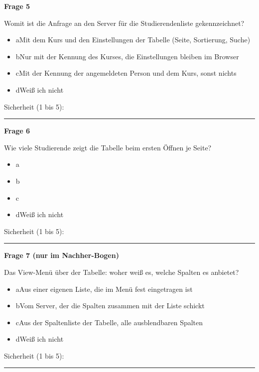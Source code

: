 \medskip

\noindent\begin{minipage}{\linewidth}
\textbf{Frage 5}\par
Womit ist die Anfrage an den Server für die Studierendenliste gekennzeichnet?

\begin{itemize}[nosep,leftmargin=2.4em]
\item[\kreuz] a\quad Mit dem Kurs und den Einstellungen der Tabelle (Seite, Sortierung, Suche)
\item[\kreuz] b\quad Nur mit der Kennung des Kurses, die Einstellungen bleiben im Browser
\item[\kreuz] c\quad Mit der Kennung der angemeldeten Person und dem Kurs, sonst nichts
\item[\kreuz] d\quad Weiß ich nicht
\end{itemize}
\noindent Sicherheit (1 bis 5):~\rule{2.5em}{0.4pt}\par
\end{minipage}

\medskip

\noindent\begin{minipage}{\linewidth}
\textbf{Frage 6}\par
Wie viele Studierende zeigt die Tabelle beim ersten Öffnen je Seite?

\begin{itemize}[nosep,leftmargin=2.4em]
\item[\kreuz] a
\item[\kreuz] b
\item[\kreuz] c
\item[\kreuz] d\quad Weiß ich nicht
\end{itemize}
\noindent Sicherheit (1 bis 5):~\rule{2.5em}{0.4pt}\par
\end{minipage}

\medskip

\noindent\begin{minipage}{\linewidth}
\textbf{Frage 7 (nur im Nachher-Bogen)}\par
Das View-Menü über der Tabelle: woher weiß es, welche Spalten es anbietet?

\begin{itemize}[nosep,leftmargin=2.4em]
\item[\kreuz] a\quad Aus einer eigenen Liste, die im Menü fest eingetragen ist
\item[\kreuz] b\quad Vom Server, der die Spalten zusammen mit der Liste schickt
\item[\kreuz] c\quad Aus der Spaltenliste der Tabelle, alle ausblendbaren Spalten
\item[\kreuz] d\quad Weiß ich nicht
\end{itemize}
\noindent Sicherheit (1 bis 5):~\rule{2.5em}{0.4pt}\par
\end{minipage}

